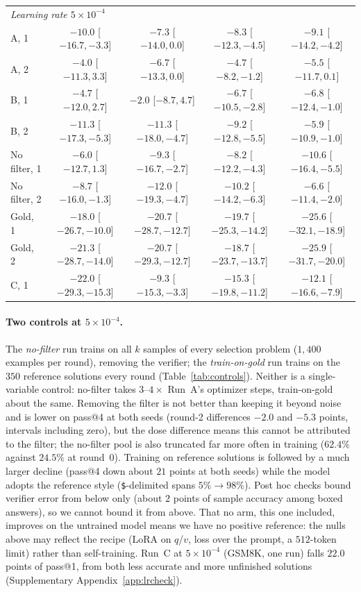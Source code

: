 \documentclass[runningheads]{llncs}
\begin{document}
\begin{table}[!htb]
\begin{tabular}{lcccc}
\midrule
\multicolumn{5}{l}{\emph{Learning rate $5\!\times\!10^{-4}$}} \\
A, 1 & $-10.0$ [$-16.7,-3.3$] & $-7.3$ [$-14.0,0.0$] & $-8.3$ [$-12.3,-4.5$] & $-9.1$ [$-14.2,-4.2$] \\
A, 2 & $-4.0$ [$-11.3,3.3$] & $-6.7$ [$-13.3,0.0$] & $-4.7$ [$-8.2,-1.2$] & $-5.5$ [$-11.7,0.1$] \\
B, 1 & $-4.7$ [$-12.0,2.7$] & $-2.0$ [$-8.7,4.7$] & $-6.7$ [$-10.5,-2.8$] & $-6.8$ [$-12.4,-1.0$] \\
B, 2 & $-11.3$ [$-17.3,-5.3$] & $-11.3$ [$-18.0,-4.7$] & $-9.2$ [$-12.8,-5.5$] & $-5.9$ [$-10.9,-1.0$] \\
No filter, 1 & $-6.0$ [$-12.7,1.3$] & $-9.3$ [$-16.7,-2.7$] & $-8.2$ [$-12.2,-4.3$] & $-10.6$ [$-16.4,-5.5$] \\
No filter, 2 & $-8.7$ [$-16.0,-1.3$] & $-12.0$ [$-19.3,-4.7$] & $-10.2$ [$-14.2,-6.3$] & $-6.6$ [$-11.4,-2.0$] \\
Gold, 1 & $-18.0$ [$-26.7,-10.0$] & $-20.7$ [$-28.7,-12.7$] & $-19.7$ [$-25.3,-14.2$] & $-25.6$ [$-32.1,-18.9$] \\
Gold, 2 & $-21.3$ [$-28.7,-14.0$] & $-20.7$ [$-29.3,-12.7$] & $-18.7$ [$-23.7,-13.7$] & $-25.9$ [$-31.7,-20.0$] \\
C, 1 & $-22.0$ [$-29.3,-15.3$] & $-9.3$ [$-15.3,-3.3$] & $-15.3$ [$-19.8,-11.2$] & $-12.1$ [$-16.6,-7.9$] \\
\bottomrule
\end{tabular}
\end{table}

\paragraph{Two controls at $5\times10^{-4}$.}
The \emph{no-filter} run trains on all $k$ samples of every selection problem
($1{,}400$ examples per round), removing the verifier; the
\emph{train-on-gold} run trains on the $350$ reference solutions every round
(Table~\ref{tab:controls}). Neither is a single-variable control: no-filter
takes $3$--$4\times$ Run~A's optimizer steps, train-on-gold about the same.
Removing the filter is not better than keeping it beyond noise and is lower on
pass@4 at both seeds (round-2 differences $-2.0$ and $-5.3$ points, intervals
including zero), but the dose difference means this cannot be attributed to the
filter; the no-filter pool is also truncated far more often in training
($62.4\%$ against $24.5\%$ at round~0). Training on reference solutions is
followed by a much larger decline (pass@4 down about $21$ points at both
seeds) while the model adopts the reference style (\texttt{\$}-delimited
spans $5\%\to98\%$). Post hoc checks bound verifier error from below only
(about $2$ points of sample accuracy among boxed answers), so we cannot bound it from above.
That no arm, this one included, improves on the untrained model means we have
no positive reference: the nulls above may reflect the recipe (LoRA on
$q$/$v$, loss over the prompt, a $512$-token limit) rather than
self-training. Run~C at
$5\times10^{-4}$ (GSM8K, one run) falls $22.0$ points of pass@1, from both less
accurate and more unfinished solutions (Supplementary Appendix~\ref{app:lrcheck}).
\end{document}
